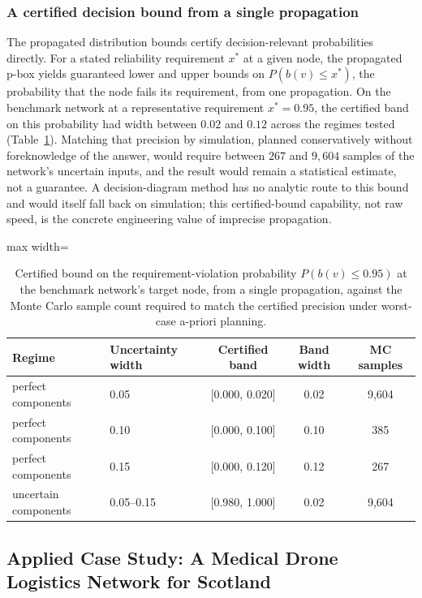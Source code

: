 \documentclass[preprint,12pt]{elsarticle}
\begin{document}
\subsubsection{A certified decision bound from a single propagation}\label{sec:certified}

The propagated distribution bounds certify decision-relevant probabilities directly. For a stated reliability requirement $x^\ast$ at a given node, the propagated p-box yields guaranteed lower and upper bounds on $P(b(v)\le x^\ast)$, the probability that the node fails its requirement, from one propagation. On the benchmark network at a representative requirement $x^\ast=0.95$, the certified band on this probability had width between $0.02$ and $0.12$ across the regimes tested (Table~\ref{tab:certified}). Matching that precision by simulation, planned conservatively without foreknowledge of the answer, would require between $267$ and $9{,}604$ samples of the network's uncertain inputs, and the result would remain a statistical estimate, not a guarantee. A decision-diagram method has no analytic route to this bound and would itself fall back on simulation; this certified-bound capability, not raw speed, is the concrete engineering value of imprecise propagation.

\begin{table}[ht]
\centering\small
\caption{Certified bound on the requirement-violation probability $P(b(v)\le0.95)$ at the benchmark network's target node, from a single propagation, against the Monte Carlo sample count required to match the certified precision under worst-case a-priori planning.}
\label{tab:certified}
\begin{adjustbox}{max width=\linewidth}
\begin{tabular}{llccc}
\toprule
Regime & Uncertainty width & Certified band & Band width & MC samples \\
\midrule
perfect components   & 0.05      & [0.000, 0.020] & 0.02 & 9{,}604 \\
perfect components   & 0.10      & [0.000, 0.100] & 0.10 & 385 \\
perfect components   & 0.15      & [0.000, 0.120] & 0.12 & 267 \\
uncertain components & 0.05--0.15 & [0.980, 1.000] & 0.02 & 9{,}604 \\
\bottomrule
\end{tabular}
\end{adjustbox}
\end{table}

\subsection{Applied Case Study: A Medical Drone Logistics Network for Scotland}\label{sec:drone}
\end{document}
